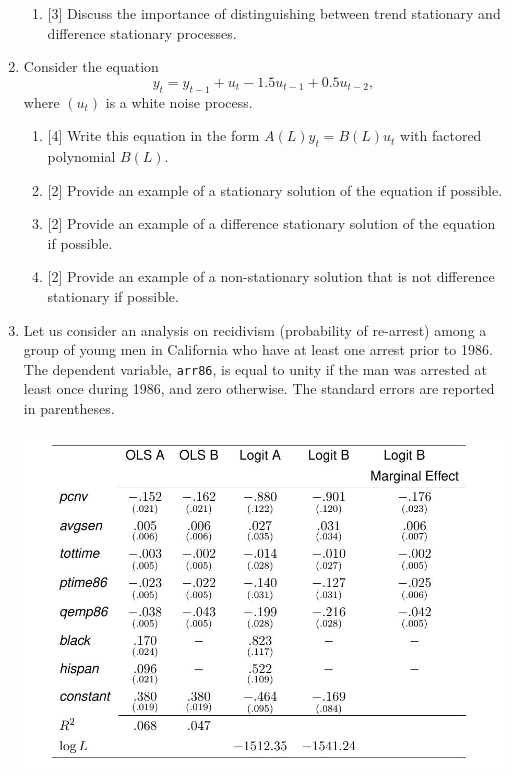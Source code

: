 \documentclass[12pt]{article}
\begin{document}
\begin{enumerate}
\begin{enumerate}
    \item {[3]} Discuss the importance of distinguishing between trend stationary and difference stationary processes.
\end{enumerate}


\item Consider the equation 
\[
y_t = y_{t-1} + u_t -1.5u_{t-1} + 0.5u_{t-2},
\]
where $(u_t)$ is a white noise process. 

\begin{enumerate}
    \item {[4]} Write this equation in the form $A(L)y_t = B(L)u_t$ with factored polynomial $B(L)$.
    \item {[2]} Provide an example of a stationary solution of the equation if possible.
    \item {[2]} Provide an example of a difference stationary solution of the equation if possible.
    \item {[2]} Provide an example of a non-stationary solution that is not difference stationary if possible.
\end{enumerate}

\newpage

\item Let us consider an analysis on recidivism (probability of re-arrest) among a group of young men in California 
who have at least one arrest prior to 1986. 
The dependent variable, \verb|arr86|, is equal to unity if the man was arrested at least once during 1986, and zero otherwise.
The standard errors are reported in parentheses.

\includegraphics[scale=0.5]{reg_table.jpg}


\end{enumerate}
\end{document}
